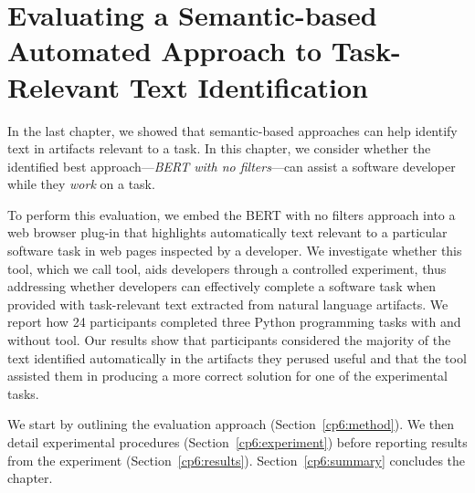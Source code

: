 \setcounter{chapter}{5}


\chapter{Evaluating a Semantic-based Automated Approach to Task-Relevant Text Identification}
\label{ch:assisting}


In the last chapter, we showed that semantic-based approaches can help identify text in artifacts relevant to a task. 
In this chapter, we consider whether the identified best approach---\textit{BERT with no filters}---can assist a software developer while they \textit{work} on a task.


To perform this evaluation, we embed the BERT with no filters approach into a web browser plug-in that  highlights automatically
text relevant to a particular software task in web pages inspected by a developer.
We investigate whether this tool, which we call \acs{tool}, aids developers through a controlled experiment,
thus addressing whether developers can effectively complete a software task 
when provided with task-relevant text  extracted from natural language artifacts. 
We report how  24 participants completed three Python programming tasks 
with and without \acs{tool}.
Our results show that participants considered the majority of the text  identified automatically in the artifacts 
they perused useful and that 
the tool assisted them in producing a more correct solution for one of the experimental tasks.



We start by outlining the evaluation approach  (Section~\ref{cp6:method}). We then
detail experimental procedures  (Section~\ref{cp6:experiment}) before reporting
results from the experiment 
(Section~\ref{cp6:results}).
Section~\ref{cp6:summary} concludes the chapter.
















% 

